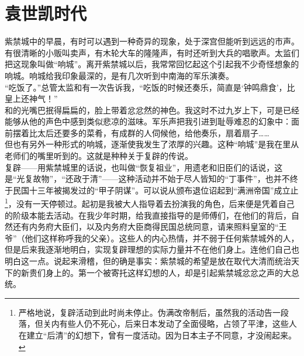 \fancyhead[RO]{} %
\fancyhead[LE]{} %
\chapter*{袁世凯时代}
\thispagestyle{empty}
紫禁城中的早晨，有时可以遇到一种奇异的现象，处于深宫但能听到远远的市声。有很清晰的小贩叫卖声，有木轮大车的隆隆声，有时还听到大兵的唱歌声。太监们把这现象叫做“响城”。离开紫禁城以后，我常常回忆起这个引起我不少奇怪想象的响城。响城给我印象最深的，是有几次听到中南海的军乐演奏。\\

“吃饭了。”总管太监和有一次告诉我，“吃饭的时候还奏乐，简直是‘钟鸣鼎食’，比皇上还神气！”\\

和的光嘴巴抿得扁扁的，脸上带着忿忿然的神色。我这时不过九岁上下，可是已经能够从他的声色中感到类似悲凉的滋味。军乐声把我引进到耻辱难忍的幻象中：面前摆着比太后还要多的菜肴，有成群的人伺候他，给他奏乐，扇着扇子……\\

但也有另外一种形式的响城，逐渐使我发生了浓厚的兴趣。这种“响城”是我在里从老师们的嘴里听到的。这就是种种关于复辟的传说。\\

复辟——用紫禁城里的话说，也叫做“恢复祖业”，用遗老和旧臣们的话说，这是“光复故物”，“还政于清”——这种活动并不始于尽人皆知的“丁事件”，也并不终于民国十三年被揭发过的“甲子阴谋”。可以说从颁布退位诏起到“满洲帝国”成立止\footnote{严格地说，复辟活动到此时尚未停止。伪满改帝制后，虽然我的活动告一段落，但关内有些人仍不死心，后来日本发动了全面侵略，占领了平津，这些人在建立“后清”的幻想下，曾有一度活动。因为日本主子不同意，才没闹起来。}，没有一天停顿过。起初是我被大人指导着去扮演我的角色，后来便是凭着自己的阶级本能去活动。在我少年时期，给我直接指导的是师傅们，在他们的背后，自然还有内务府大臣们，以及内务府大臣商得民国总统同意，请来照料皇室的“王爷”（他们这样称呼我的父亲）。这些人的内心热情，并不弱于任何紫禁城外的人，但是后来我逐渐地明白，实现复辟理想的实际力量并不在他们身上。连他们自己也明白这一点。说起来滑稽，但的确是事实：紫禁城的希望是放在取代大清而统治天下的新贵们身上的。第一个被寄托这样幻想的人，却是引起紫禁城忿忿之声的大总统。\\


